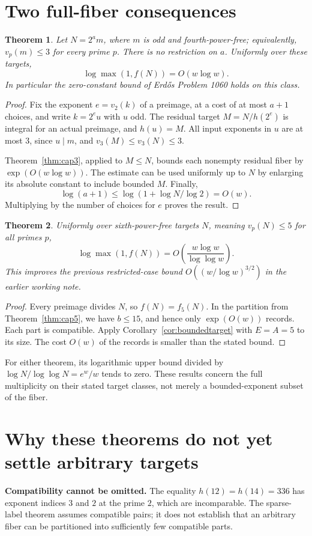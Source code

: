 \documentclass[11pt]{article}
\newtheorem{theorem}{Theorem}[section]
\begin{document}
\section{Two full-fiber consequences}
\begin{theorem}\label{thm:unboundedtwo}
Let $N=2^a m$, where $m$ is odd and fourth-power-free; equivalently, $v_p(m)\le3$ for every prime $p$. There is no restriction on $a$. Uniformly over these targets,
\[
 \boxed{\log\max(1,f(N))=O(w\log w).}
\]
In particular the zero-constant bound of Erd\H{o}s Problem 1060 holds on this class.
\end{theorem}
\begin{proof}
Fix the exponent $e=v_2(k)$ of a preimage, at a cost of at most $a+1$ choices, and write $k=2^e u$ with $u$ odd. The residual target $M=N/h(2^e)$ is integral for an actual preimage, and $h(u)=M$. All input exponents in $u$ are at most $3$, since $u\mid m$, and $v_3(M)\le v_3(N)\le3$.

Theorem~\ref{thm:cap3}, applied to $M\le N$, bounds each nonempty residual fiber by $\exp(O(w\log w))$. The estimate can be used uniformly up to $N$ by enlarging its absolute constant to include bounded $M$. Finally,
\[
 \log(a+1)\le\log(1+\log N/\log2)=O(w).
\]
Multiplying by the number of choices for $e$ proves the result.
\end{proof}

\begin{theorem}\label{thm:sixth}
Uniformly over sixth-power-free targets $N$, meaning $v_p(N)\le5$ for all primes $p$,
\[
 \boxed{\log\max(1,f(N))
 =O\!\left(\frac{w\log w}{\log\log w}\right).}
\]
This improves the previous restricted-case bound $O((w/\log w)^{3/2})$ in the earlier working note.
\end{theorem}
\begin{proof}
Every preimage divides $N$, so $f(N)=f_5(N)$. In the partition from Theorem~\ref{thm:cap5}, we have $b\le15$, and hence only $\exp(O(w))$ records. Each part is compatible. Apply Corollary~\ref{cor:boundedtarget} with $E=A=5$ to its size. The cost $O(w)$ of the records is smaller than the stated bound.
\end{proof}

For either theorem, its logarithmic upper bound divided by $\log N/\log\log N=e^w/w$ tends to zero. These results concern the full multiplicity on their stated target classes, not merely a bounded-exponent subset of the fiber.

\section{Why these theorems do not yet settle arbitrary targets}
\textbf{Compatibility cannot be omitted.} The equality $h(12)=h(14)=336$ has exponent indices $3$ and $2$ at the prime $2$, which are incomparable. The sparse-label theorem assumes compatible pairs; it does not establish that an arbitrary fiber can be partitioned into sufficiently few compatible parts.
\end{document}
